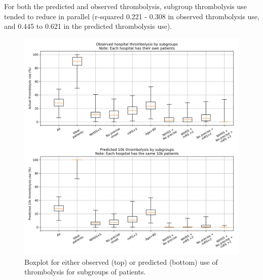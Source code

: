 For both the predicted and observed thrombolysis, subgroup thrombolysis use tended to reduce in parallel (r-squared 0.221 - 0.308 in observed thrombolysis use, and 0.445 to 0.621 in the predicted thrombolysis use).

\begin{figure}
\centering
\includegraphics[width=1\textwidth]{./images/15a_actual_vs_modelled_subgroup_violin}
\caption{Boxplot for either observed (top) or predicted (bottom) use of thrombolysis for subgroups of patients.}
\label{fig:results_boxplot}
\end{figure}









